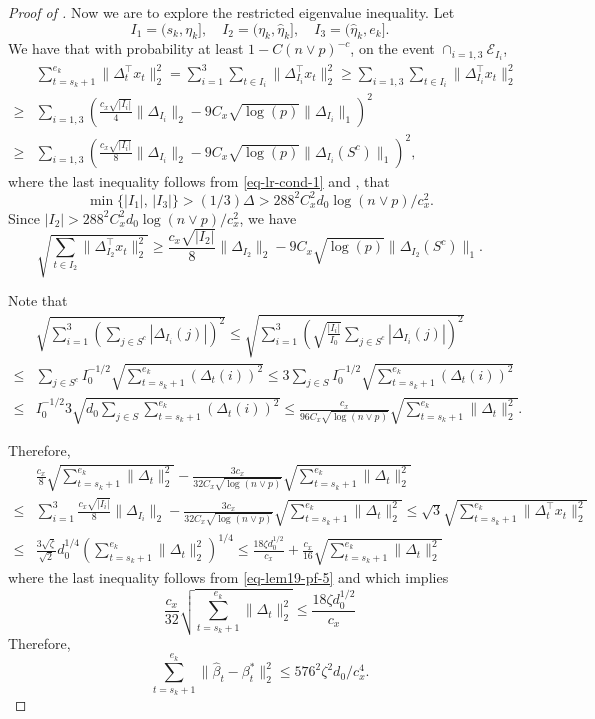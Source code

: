 \documentclass[twoside]{article}
\begin{document}
\begin{proof}[Proof of ]
Now we are to explore the restricted eigenvalue inequality.  Let
	\[
		I_1 = (s_k, \eta_k], \quad I_2 = (\eta_k, \widehat{\eta}_k], \quad I_3 = (\widehat{\eta}_k, e_k].
	\]
	We have that with probability at least $1 - C(n \vee p)^{-c}$, on the event $\cap_{i = 1, 3}\mathcal{E}_{I_i}$,
	\begin{align*}
		& \sum_{t = s_k + 1}^{e_k} \|\Delta_t^{\top} x_t\|_2^2 = \sum_{i = 1}^3 \sum_{t \in I_i}\|\Delta_{I_i}^{\top}x_t\|_2^2 \geq \sum_{i = 1, 3}\sum_{t \in I_i}\|\Delta_{I_i}^{\top}x_t\|_2^2 \\
		\geq & \sum_{i = 1, 3} \left(\frac{c_x\sqrt{|I_i|}}{4} \|\Delta_{I_i}\|_2 - 9C_x \sqrt{\log(p)} \|\Delta_{I_i}\|_1\right)^2 \\
		\geq & \sum_{i = 1, 3} \left(\frac{c_x\sqrt{|I_i|}}{8} \|\Delta_{I_i}\|_2 - 9C_x \sqrt{\log(p)} \|\Delta_{I_i}(S^c)\|_1\right)^2,
	\end{align*}
	where the last inequality follows from \eqref{eq-lr-cond-1} and , that 
	\[
		\min\{|I_1|, \, |I_3|\} > (1/3)\Delta > 288^2 C^2_x d_0 \log(n \vee p)/c_x^2.
	\]
	Since $|I_2| > 288^2 C^2_x d_0 \log(n \vee p)/c_x^2$, we have
	\[
		\sqrt{\sum_{t \in I_2}\|\Delta_{I_2}^{\top}x_t\|_2^2} \geq \frac{c_x\sqrt{|I_2|}}{8} \|\Delta_{I_2}\|_2 - 9C_x \sqrt{\log(p)} \|\Delta_{I_2}(S^c)\|_1.
	\]

Note that
	\begin{align*}
		& \sqrt{\sum_{i = 1}^3 \left(\sum_{j \in S^c} |\Delta_{I_i}(j)|\right)^2 } \leq \sqrt{\sum_{i = 1}^3\left(\sqrt{\frac{|I_i|}{I_0}} \sum_{j \in S^c}|\Delta_{I_i}(j)| \right)^2}	 \\
		\leq & \sum_{j \in S^c} I_0^{-1/2} \sqrt{\sum_{t = s_k + 1}^{e_k} (\Delta_t(i))^2} \leq 3\sum_{j \in S} I_0^{-1/2} \sqrt{\sum_{t = s_k + 1}^{e_k} (\Delta_t(i))^2} \\
		\leq & I_0^{-1/2}3 \sqrt{d_0 \sum_{j \in S} \sum_{t = s_k + 1}^{e_k} (\Delta_t(i))^2} \leq \frac{c_x}{96 C_x \sqrt{\log(n \vee p)}} \sqrt{\sum_{t = s_k + 1}^{e_k} \|\Delta_t\|_2^2}.
	\end{align*}

Therefore,
	\begin{align*}
		& \frac{c_x}{8}\sqrt{\sum_{t = s_k + 1}^{e_k} \|\Delta_t\|_2^2} - \frac{3c_x}{32 C_x \sqrt{\log(n \vee p)}} \sqrt{\sum_{t = s_k + 1}^{e_k} \|\Delta_t\|_2^2} \\
		\leq & \sum_{i = 1}^3 \frac{c_x\sqrt{|I_i|}}{8} \|\Delta_{I_i}\|_2 - \frac{3c_x}{32 C_x \sqrt{\log(n \vee p)}} \sqrt{\sum_{t = s_k + 1}^{e_k} \|\Delta_t\|_2^2} \leq \sqrt{3} \sqrt{ \sum_{t = s_k + 1}^{e_k} \|\Delta_t^{\top} x_t\|_2^2 } \\
		\leq & \frac{3\sqrt{\zeta}}{\sqrt{2}}d_0^{1/4} \left(\sum_{t = s_k + 1}^{e_k} \|\Delta_t\|_2^2\right)^{1/4} \leq \frac{18\zeta d_0^{1/2}}{c_x} + \frac{c_x}{16}\sqrt{\sum_{t = s_k + 1}^{e_k} \|\Delta_t\|_2^2}
	\end{align*}
	where the last inequality follows from \eqref{eq-lem19-pf-5} and which implies
	\[
		\frac{c_x}{32}\sqrt{\sum_{t = s_k + 1}^{e_k} \|\Delta_t\|_2^2} \leq \frac{18\zeta d_0^{1/2}}{c_x}
	\]	
	Therefore,
	\[
		\sum_{t = s_k + 1}^{e_k}\|\widehat{\beta}_t - \beta^*_t\|_2^2 \leq 576^2\zeta^2d_0/c_x^4.
	\]



\end{proof}
\end{document}
